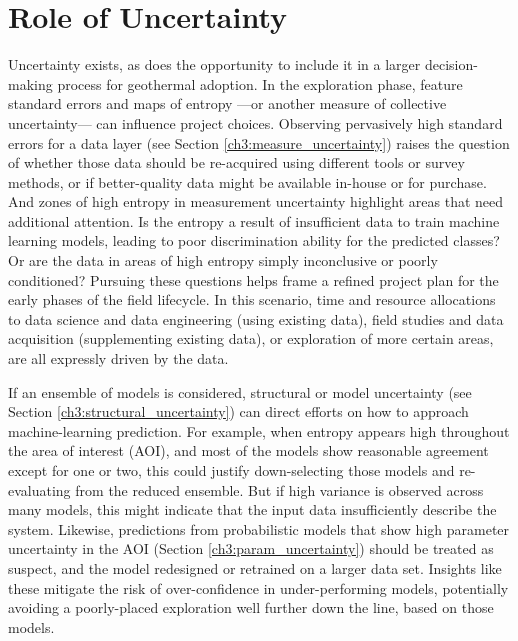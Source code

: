 \section{Role of Uncertainty}\label{ch7:uncertainty_role}

Uncertainty exists, as does the opportunity to include it in a larger decision-making process for geothermal adoption. In the exploration phase, feature standard errors and maps of entropy ---or another measure of collective uncertainty--- can influence project choices. Observing pervasively high standard errors for a data layer (see Section \ref{ch3:measure_uncertainty}) raises the question of whether those data should be re-acquired using different tools or survey methods, or if better-quality data might be available in-house or for purchase. And zones of high entropy in measurement uncertainty highlight areas that need additional attention. Is the entropy a result of insufficient data to train machine learning models, leading to poor discrimination ability for the predicted classes? Or are the data in areas of high entropy simply inconclusive or poorly conditioned? Pursuing these questions helps frame a refined project plan for the early phases of the field lifecycle. In this scenario, time and resource allocations to data science and data engineering (using existing data), field studies and data acquisition (supplementing existing data), or exploration of more certain areas, are all expressly driven by the data.

If an ensemble of models is considered, structural or model uncertainty (see Section \ref{ch3:structural_uncertainty}) can direct efforts on how to approach machine-learning prediction. For example, when entropy appears high throughout the area of interest (AOI), and most of the models show reasonable agreement except for one or two, this could justify down-selecting those models and re-evaluating from the reduced ensemble. But if high variance is observed across many models, this might indicate that the input data insufficiently describe the system. Likewise, predictions from probabilistic models that show high parameter uncertainty in the AOI (Section \ref{ch3:param_uncertainty}) should be treated as suspect, and the model redesigned or retrained on a larger data set. Insights like these mitigate the risk of over-confidence in under-performing models, potentially avoiding a poorly-placed exploration well further down the line, based on those models.

